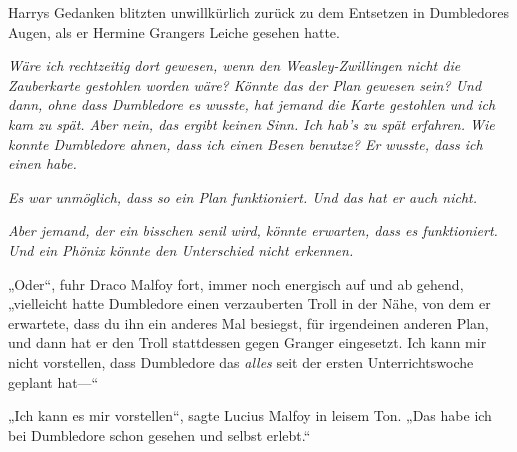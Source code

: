 Harrys Gedanken blitzten unwillkürlich zurück zu dem Entsetzen in Dumbledores Augen, als er Hermine Grangers Leiche gesehen hatte.

\emph{Wäre ich rechtzeitig dort gewesen, wenn den Weasley-Zwillingen nicht die Zauberkarte gestohlen worden wäre? Könnte das der Plan gewesen sein? Und dann, ohne dass Dumbledore es wusste, hat jemand die Karte gestohlen und ich kam zu spät. Aber nein, das ergibt keinen Sinn. Ich hab’s zu spät erfahren. Wie konnte Dumbledore ahnen, dass ich einen Besen benutze? Er wusste, dass ich einen habe.}


\emph{Es war unmöglich, dass so ein Plan funktioniert. Und das hat er auch nicht.}

\emph{Aber jemand, der ein bisschen senil wird, könnte \emph{erwarten}, dass es funktioniert. Und ein Phönix könnte den Unterschied nicht erkennen.}

„Oder“, fuhr Draco Malfoy fort, immer noch energisch auf und ab gehend, „vielleicht hatte Dumbledore einen verzauberten Troll in der Nähe, von dem er erwartete, dass du ihn ein anderes Mal besiegst, für irgendeinen anderen Plan, und dann hat er den Troll stattdessen gegen Granger eingesetzt. Ich kann mir nicht vorstellen, dass Dumbledore das \emph{alles} seit der ersten Unterrichtswoche geplant hat—“

„Ich kann es mir vorstellen“, sagte Lucius Malfoy in leisem Ton. „Das habe ich bei Dumbledore schon gesehen und selbst erlebt.“

